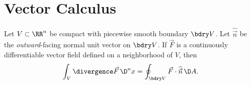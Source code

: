 \chapter{Vector Calculus}

\begin{theorem}[Divergence]\label{vector-calc-0000}%
Let $V\subset\RR^{n}$ be compact with piecewise smooth boundary $\bdry V$.
Let $\widehat{\vec{n}}$ be the \emph{outward}-facing normal unit vector
on $\bdry V$.
If $\vec{F}$ is a continuously differentiable vector field defined on a
neighborhood of $V$, then
\begin{equation*}
\int_{V}\divergence\vec{F}\,\D^{n}x=\oint_{\bdry V}\vec{F}\cdot\widehat{\vec{n}}\,\D A.
\end{equation*}
\end{theorem}